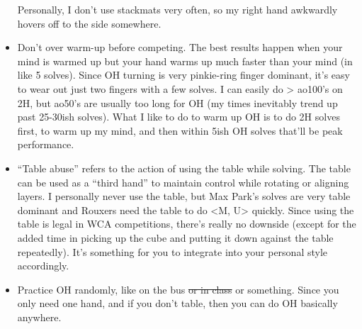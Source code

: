 \documentclass[11pt, oneside]{article}
\begin{document}
\begin{itemize}
    Personally, I don't use stackmats very often, so my right hand awkwardly
    hovers off to the side somewhere.
  \item Don't over warm-up before competing.
    The best results happen when your mind is warmed up
    but your hand warms up much faster than your mind (in like 5 solves).
    Since OH turning is very pinkie-ring finger dominant, it's easy to wear out
    just two fingers with a few solves. I can easily do > ao100's on 2H,
    but ao50's are usually too long for OH (my times inevitably trend up past
    25-30ish solves). What I like to do to warm up OH is to do 2H solves first,
    to warm up my mind, and then within 5ish OH solves that'll be
    peak performance.
  \item \enquote{Table abuse} refers to the action of using the table while
    solving. The table can be used as a \enquote{third hand} to maintain control
    while rotating or aligning layers. I personally never use the table, but
    Max Park's solves are very table dominant and Rouxers need the table to do
    <M, U> quickly. Since using the table is legal in WCA competitions, there's
    really no downside (except for the added time in picking up the cube and
    putting it down against the table repeatedly). It's something for you to
    integrate into your personal style accordingly. 
  \item Practice OH randomly, like on the bus \sout{or in class} or something.
    Since you only need one hand, and if you don't table,
    then you can do OH basically anywhere.
\end{itemize}
\end{document}
